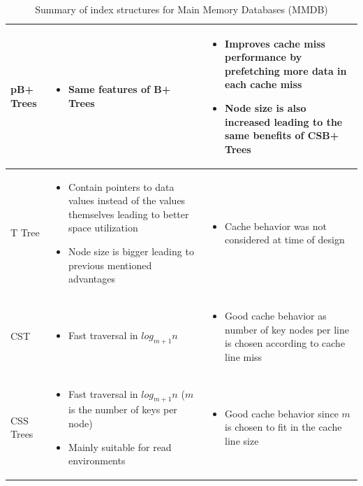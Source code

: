 \documentclass[12pt,a4paper]{article}
\begin{document}
\begin{table}[t!]
{\begin{tabular}{p{2cm}|p{6cm}|p{6cm}}
pB+ Trees & \begin{itemize}
              \item Same features of B+ Trees
             \end{itemize} &
\begin{itemize}
 \item Improves cache miss performance by prefetching more data in each cache miss
\item Node size is also increased leading to the same benefits of CSB+ Trees
\end{itemize}\\
\hline
T Tree &  \begin{itemize}
              \item Contain pointers to data values instead of the values themselves leading to better space utilization
\item Node size is bigger leading to previous mentioned advantages
             \end{itemize} &
\begin{itemize}
 \item Cache behavior was not considered at time of design
\end{itemize}\\
\hline
CST & \begin{itemize}
       \item Fast traversal in $log_{m+1}n$
      \end{itemize} &
\begin{itemize}
 \item Good cache behavior as number of key nodes per line is chosen according to cache line miss
\end{itemize}\\
\hline
CSS Trees &  \begin{itemize}
       \item Fast traversal in $log_{m+1}n$ ($m$ is the number of keys per node)
\item Mainly suitable for read environments
      \end{itemize} &
\begin{itemize}
 \item Good cache behavior since $m$ is chosen to fit in the cache line size
\end{itemize}\\

\end{tabular}
}
\caption{Summary of index structures for Main Memory Databases (MMDB)}
\label{tab:mmdbindexsumm}
\end{table}
\end{document}
